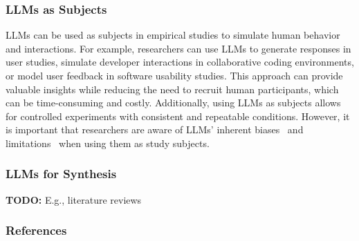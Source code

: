 \documentclass[11pt]{article}
\begin{document}
\subsubsection{LLMs as Subjects}

LLMs can be used as subjects in empirical studies to simulate human behavior and interactions.
For example, researchers can use LLMs to generate responses in user studies, simulate developer interactions in collaborative coding environments, or model user feedback in software usability studies.
This approach can provide valuable insights while reducing the need to recruit human participants, which can be time-consuming and costly.
Additionally, using LLMs as subjects allows for controlled experiments with consistent and repeatable conditions.
However, it is important that researchers are aware of LLMs' inherent biases~\cite{Crowell2023} and limitations~\cite{DBLP:journals/ais/HardingDLL24} when using them as study subjects.

\subsubsection{LLMs for Synthesis}

\textbf{TODO:} E.g., literature reviews

\subsubsection{References}



\end{document}
